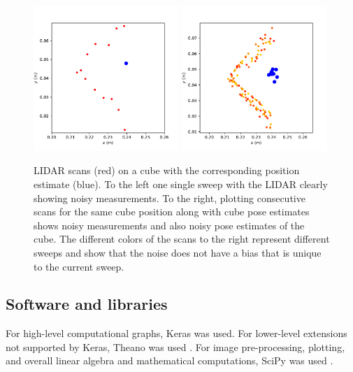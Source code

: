 \begin{figure}[h]
    \centering
    \includegraphics[width=0.49\textwidth]{res/cube_pose_lidar_one_scan.pdf}
    \includegraphics[width=0.49\textwidth]{res/cube_pose_lidar_variance.pdf}

    \caption{LIDAR scans (red) on a cube with the corresponding position
    estimate (blue). To the left one single sweep with the LIDAR clearly
    showing noisy measurements. To the right, plotting consecutive scans for
    the same cube position along with cube pose estimates shows noisy
    measurements and also noisy pose estimates of the cube. The different
    colors of the scans to the right represent different sweeps and show that
    the noise does not have a bias that is unique to the current sweep.}

    \label{fig:lidar_noise}
\end{figure}

\subsection{Software and libraries}

For high-level computational graphs, Keras \cite{chollet2015keras} was used.
For lower-level extensions not supported by Keras, Theano was used
\cite{theano2016theano}. For image pre-processing, plotting, and overall linear
algebra and mathematical computations, SciPy was used \cite{scipy2016scipy}.
